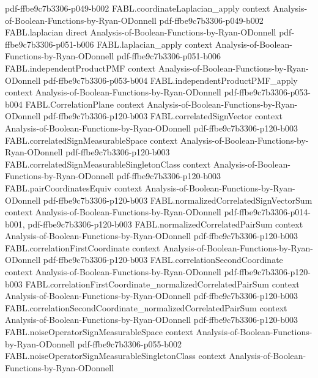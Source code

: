 \begin{theorem}
  {pdf-ffbe9c7b3306-p049-b002}
\proofstep
  {FABL.coordinateLaplacian_apply}
  {context}
  {Analysis-of-Boolean-Functions-by-Ryan-ODonnell}
  {pdf-ffbe9c7b3306-p049-b002}
\proofstep
  {FABL.laplacian}
  {direct}
  {Analysis-of-Boolean-Functions-by-Ryan-ODonnell}
  {pdf-ffbe9c7b3306-p051-b006}
\proofstep
  {FABL.laplacian_apply}
  {context}
  {Analysis-of-Boolean-Functions-by-Ryan-ODonnell}
  {pdf-ffbe9c7b3306-p051-b006}
\proofstep
  {FABL.independentProductPMF}
  {context}
  {Analysis-of-Boolean-Functions-by-Ryan-ODonnell}
  {pdf-ffbe9c7b3306-p053-b004}
\proofstep
  {FABL.independentProductPMF_apply}
  {context}
  {Analysis-of-Boolean-Functions-by-Ryan-ODonnell}
  {pdf-ffbe9c7b3306-p053-b004}
\proofstep
  {FABL.CorrelationPlane}
  {context}
  {Analysis-of-Boolean-Functions-by-Ryan-ODonnell}
  {pdf-ffbe9c7b3306-p120-b003}
\proofstep
  {FABL.correlatedSignVector}
  {context}
  {Analysis-of-Boolean-Functions-by-Ryan-ODonnell}
  {pdf-ffbe9c7b3306-p120-b003}
\proofstep
  {FABL.correlatedSignMeasurableSpace}
  {context}
  {Analysis-of-Boolean-Functions-by-Ryan-ODonnell}
  {pdf-ffbe9c7b3306-p120-b003}
\proofstep
  {FABL.correlatedSignMeasurableSingletonClass}
  {context}
  {Analysis-of-Boolean-Functions-by-Ryan-ODonnell}
  {pdf-ffbe9c7b3306-p120-b003}
\proofstep
  {FABL.pairCoordinatesEquiv}
  {context}
  {Analysis-of-Boolean-Functions-by-Ryan-ODonnell}
  {pdf-ffbe9c7b3306-p120-b003}
\proofstep
  {FABL.normalizedCorrelatedSignVectorSum}
  {context}
  {Analysis-of-Boolean-Functions-by-Ryan-ODonnell}
  {pdf-ffbe9c7b3306-p014-b001,
    pdf-ffbe9c7b3306-p120-b003}
\proofstep
  {FABL.normalizedCorrelatedPairSum}
  {context}
  {Analysis-of-Boolean-Functions-by-Ryan-ODonnell}
  {pdf-ffbe9c7b3306-p120-b003}
\proofstep
  {FABL.correlationFirstCoordinate}
  {context}
  {Analysis-of-Boolean-Functions-by-Ryan-ODonnell}
  {pdf-ffbe9c7b3306-p120-b003}
\proofstep
  {FABL.correlationSecondCoordinate}
  {context}
  {Analysis-of-Boolean-Functions-by-Ryan-ODonnell}
  {pdf-ffbe9c7b3306-p120-b003}
\proofstep
  {FABL.correlationFirstCoordinate_normalizedCorrelatedPairSum}
  {context}
  {Analysis-of-Boolean-Functions-by-Ryan-ODonnell}
  {pdf-ffbe9c7b3306-p120-b003}
\proofstep
  {FABL.correlationSecondCoordinate_normalizedCorrelatedPairSum}
  {context}
  {Analysis-of-Boolean-Functions-by-Ryan-ODonnell}
  {pdf-ffbe9c7b3306-p120-b003}
\proofstep
  {FABL.noiseOperatorSignMeasurableSpace}
  {context}
  {Analysis-of-Boolean-Functions-by-Ryan-ODonnell}
  {pdf-ffbe9c7b3306-p055-b002}
\proofstep
  {FABL.noiseOperatorSignMeasurableSingletonClass}
  {context}
  {Analysis-of-Boolean-Functions-by-Ryan-ODonnell}

\end{theorem}
